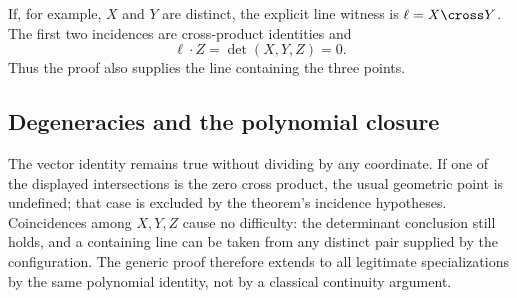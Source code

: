 If, for example, $X$ and $Y$ are distinct, the explicit line witness is
$\ell=X\cross Y$.  The first two incidences are cross-product identities and
\[
 \ell\cdot Z=\det(X,Y,Z)=0.
\]
Thus the proof also supplies the line containing the three points.

\subsection{Degeneracies and the polynomial closure}

The vector identity remains true without dividing by any coordinate.  If one
of the displayed intersections is the zero cross product, the usual geometric
point is undefined; that case is excluded by the theorem's incidence
hypotheses.  Coincidences among $X,Y,Z$ cause no difficulty: the determinant
conclusion still holds, and a containing line can be taken from any distinct
pair supplied by the configuration.  The generic proof therefore extends to
all legitimate specializations by the same polynomial identity, not by a
classical continuity argument.
